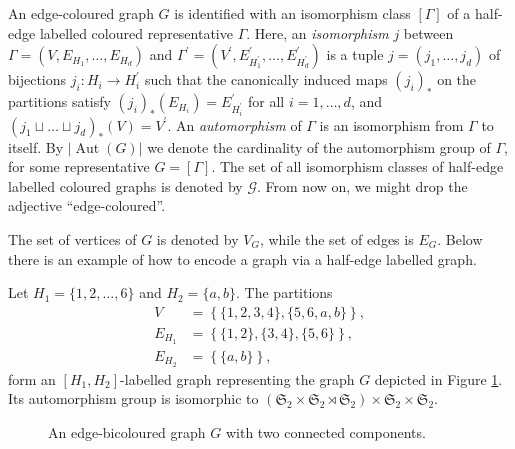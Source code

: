 \documentclass[11pt, a4paper]{article}
\numberwithin{theorem}{section}
\theoremstyle{remark}
\newenvironment{example}
{\pushQED{\qed}\renewcommand{\qedsymbol}{$\diamond$}\examplex}
{\popQED\endexamplex}
\newcommand{\GG}{\mathcal{G}}
\DeclareMathOperator{\Aut}{Aut}
\newcommand{\Sym}{\mathfrak{S}}
\theoremstyle{theorem}
\begin{document}
An edge-coloured graph $G$ is identified with an isomorphism class $[\Gamma]$ of a half-edge labelled coloured representative $\Gamma$. Here, an \emph{isomorphism} $j$ between $\Gamma = (V, E_{H_1},\dots, E_{H_d})$ and $\Gamma^\prime = (V^\prime, E^\prime_{H^\prime_1},\dots, E^\prime_{H^\prime_d})$ is a tuple $j = (j_1,\dots,j_d)$ of bijections $j_i\colon H_i \rightarrow H^\prime_i$ such that the canonically induced maps $(j_i)_\ast$ on the partitions satisfy $(j_i)_\ast (E_{H_i}) = E^\prime_{H^\prime_i}$ for all $i=1,\dots,d$, and $(j_1\sqcup\dots\sqcup j_d)_\ast (V) = V^\prime$. An \emph{automorphism} of $\Gamma$ is an isomorphism from $\Gamma$ to itself. By $|\Aut(G)|$ we denote the cardinality of the automorphism group of $\Gamma$, for some representative $G = [\Gamma]$. The set of all isomorphism classes of half-edge labelled coloured graphs is denoted by $\GG$. From now on, we might drop the adjective ``edge-coloured''.\par 
The set of vertices of $G$ is denoted by $V_G$, while the set of edges is $E_G$. Below there is an example of how to encode a graph via a half-edge labelled graph.

\begin{example}
    Let $H_1 = \{1,2,\dots,6\}$ and $H_2 = \{a, b\}$. The partitions 
    \begin{align*}
        V & = \left\{ \{1,2,3,4\}, \{5,6,a,b\} \right\}, \\
        E_{H_1} & = \left\{ \{1,2\}, \{3,4\}, \{5,6\} \right\}, \\
        E_{H_2} & = \left\{ \{a,b\} \right\},
    \end{align*}
    form an $[H_1,H_2]$-labelled graph representing the graph $G$ depicted in Figure \ref{fig:extwotadpole2s_rrry}. Its automorphism group is isomorphic to $(\Sym_2\times \Sym_2 \rtimes \Sym_2) \times \Sym_2 \times \Sym_2$.
\end{example}

\begin{figure}
    \centering
{}%
    \caption{An edge-bicoloured graph $G$ with two connected components.}
\label{fig:extwotadpole2s_rrry}
\end{figure}
\end{document}
